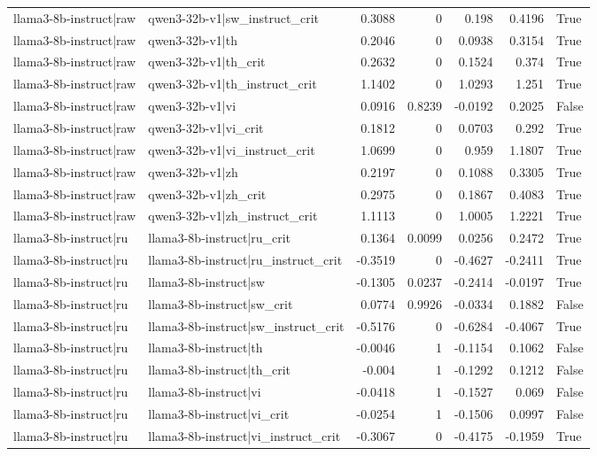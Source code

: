 \begin{table}
\begin{tabular}{l l r r r r l}
llama3-8b-instruct|raw & qwen3-32b-v1|sw_instruct_crit & 0.3088 & 0 & 0.198 & 0.4196 & True \\
llama3-8b-instruct|raw & qwen3-32b-v1|th & 0.2046 & 0 & 0.0938 & 0.3154 & True \\
llama3-8b-instruct|raw & qwen3-32b-v1|th_crit & 0.2632 & 0 & 0.1524 & 0.374 & True \\
llama3-8b-instruct|raw & qwen3-32b-v1|th_instruct_crit & 1.1402 & 0 & 1.0293 & 1.251 & True \\
llama3-8b-instruct|raw & qwen3-32b-v1|vi & 0.0916 & 0.8239 & -0.0192 & 0.2025 & False \\
llama3-8b-instruct|raw & qwen3-32b-v1|vi_crit & 0.1812 & 0 & 0.0703 & 0.292 & True \\
llama3-8b-instruct|raw & qwen3-32b-v1|vi_instruct_crit & 1.0699 & 0 & 0.959 & 1.1807 & True \\
llama3-8b-instruct|raw & qwen3-32b-v1|zh & 0.2197 & 0 & 0.1088 & 0.3305 & True \\
llama3-8b-instruct|raw & qwen3-32b-v1|zh_crit & 0.2975 & 0 & 0.1867 & 0.4083 & True \\
llama3-8b-instruct|raw & qwen3-32b-v1|zh_instruct_crit & 1.1113 & 0 & 1.0005 & 1.2221 & True \\
llama3-8b-instruct|ru & llama3-8b-instruct|ru_crit & 0.1364 & 0.0099 & 0.0256 & 0.2472 & True \\
llama3-8b-instruct|ru & llama3-8b-instruct|ru_instruct_crit & -0.3519 & 0 & -0.4627 & -0.2411 & True \\
llama3-8b-instruct|ru & llama3-8b-instruct|sw & -0.1305 & 0.0237 & -0.2414 & -0.0197 & True \\
llama3-8b-instruct|ru & llama3-8b-instruct|sw_crit & 0.0774 & 0.9926 & -0.0334 & 0.1882 & False \\
llama3-8b-instruct|ru & llama3-8b-instruct|sw_instruct_crit & -0.5176 & 0 & -0.6284 & -0.4067 & True \\
llama3-8b-instruct|ru & llama3-8b-instruct|th & -0.0046 & 1 & -0.1154 & 0.1062 & False \\
llama3-8b-instruct|ru & llama3-8b-instruct|th_crit & -0.004 & 1 & -0.1292 & 0.1212 & False \\
llama3-8b-instruct|ru & llama3-8b-instruct|vi & -0.0418 & 1 & -0.1527 & 0.069 & False \\
llama3-8b-instruct|ru & llama3-8b-instruct|vi_crit & -0.0254 & 1 & -0.1506 & 0.0997 & False \\
llama3-8b-instruct|ru & llama3-8b-instruct|vi_instruct_crit & -0.3067 & 0 & -0.4175 & -0.1959 & True \\

\end{tabular}
\end{table}

